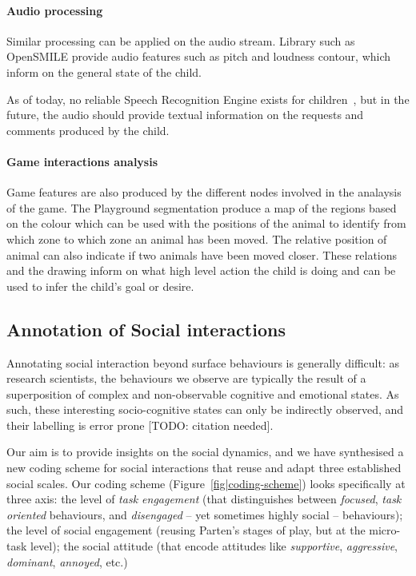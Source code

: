 \documentclass[sigconf]{acmart}
\begin{document}
\paragraph{Audio processing}

Similar processing can be applied on the audio stream. Library such as OpenSMILE
provide audio features such as pitch and loudness contour, which inform on the
general state of the child.

As of today, no reliable Speech Recognition Engine exists for
children~\cite{kennedy2017child}, but in the future, the audio should provide
textual information on the requests and comments produced by the child.

\paragraph{Game interactions analysis}


Game features are also produced by the different nodes involved in the analaysis
of the game. The Playground segmentation produce a map of the regions based on
the colour which can be used with the positions of the animal to identify from
which zone to which zone an animal has been moved. The relative position of
animal can also indicate if two animals have been moved closer. These relations
and the drawing inform on what high level action the child is doing and can be
used to infer the child's goal or desire.

\subsection{Annotation of Social interactions}
\label{sec|coding-scheme}

Annotating social interaction beyond surface behaviours is generally difficult:
as research scientists, the behaviours we observe are typically the result of a
superposition of complex and non-observable cognitive and emotional states. As
such, these interesting socio-cognitive states can only be indirectly observed,
and their labelling is error prone [TODO: citation needed].

Our aim is to provide insights on the social dynamics, and we have synthesised a
new coding scheme for social interactions that reuse and adapt three established
social scales. Our coding scheme (Figure~\ref{fig|coding-scheme}) looks specifically
at three axis: the level of \emph{task engagement} (that distinguishes between
\emph{focused}, \emph{task oriented} behaviours, and \emph{disengaged} -- yet
sometimes highly social -- behaviours); the level of social engagement (reusing
Parten's stages of play, but at the micro-task level); the social attitude (that
encode attitudes like \emph{supportive}, \emph{aggressive}, \emph{dominant},
\emph{annoyed}, etc.)
\end{document}

